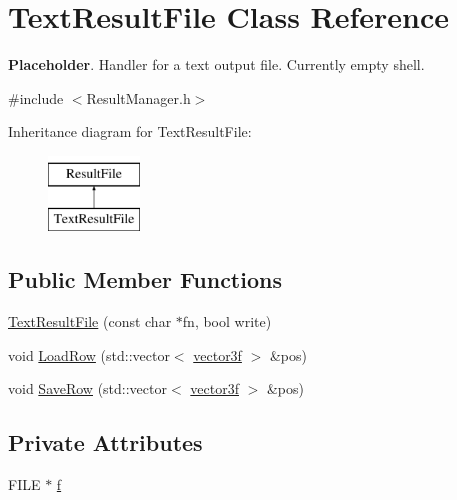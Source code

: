 \hypertarget{class_text_result_file}{}\section{Text\+Result\+File Class Reference}
\label{class_text_result_file}


{\bfseries Placeholder}. Handler for a text output file. Currently empty shell.  




{\ttfamily \#include $<$Result\+Manager.\+h$>$}

Inheritance diagram for Text\+Result\+File\+:\begin{figure}[H]
\begin{center}
\leavevmode
\includegraphics[height=2.000000cm]{class_text_result_file}
\end{center}
\end{figure}
\subsection*{Public Member Functions}
\begin{DoxyCompactItemize}
\item 
\hyperlink{class_text_result_file_abeb889d9b521bf84cb9243fe48b285b9}{Text\+Result\+File} (const char $\ast$fn, bool write)
\item 
void \hyperlink{class_text_result_file_af71ce9c554ce7541343c36f0be7fc905}{Load\+Row} (std\+::vector$<$ \hyperlink{std__incl_8h_a2feaef1d85a74bd5cf80df91b1a9a914}{vector3f} $>$ \&pos)
\item 
void \hyperlink{class_text_result_file_a844e136d4324ce46f374f995c2074d7a}{Save\+Row} (std\+::vector$<$ \hyperlink{std__incl_8h_a2feaef1d85a74bd5cf80df91b1a9a914}{vector3f} $>$ \&pos)
\end{DoxyCompactItemize}
\subsection*{Private Attributes}
\begin{DoxyCompactItemize}
\item 
F\+I\+LE $\ast$ \hyperlink{class_text_result_file_a47f9fe9269ce091f44368108c39e3022}{f}
\end{DoxyCompactItemize}


